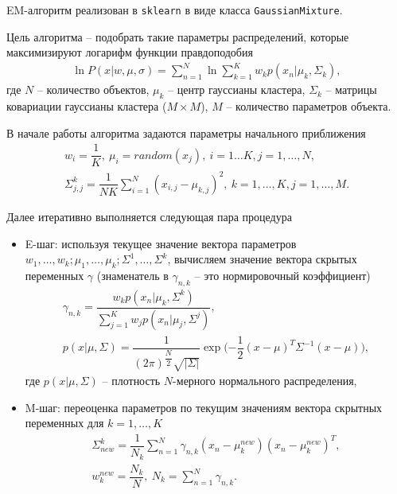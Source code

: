 \documentclass[%
	11pt,
	a4paper,
	utf8,
		]{article}
\begin{document}
EM-алгоритм реализован в \texttt{sklearn} в виде класса \texttt{GaussianMixture}.

Цель алгоритма -- подобрать такие параметры распределений, которые максимизируют логарифм функции правдоподобия
\begin{align*}
	\ln P(x | w, \mu, \sigma) = \sum_{n=1}^{N} \ln \sum_{k=1}^{K} w_k p(x_n | \mu_k, \Sigma_k),
\end{align*}
где $ N $ -- количество объектов, $ \mu_k $ -- центр гауссианы кластера, $ {\Sigma_k} $ -- матрицы ковариации гауссианы кластера ($ M \times M $), $ M $ -- количество параметров объекта.

В начале работы алгоритма задаются параметры начального приближения
\begin{align*}
	w_i = \dfrac{1}{K}, \ \mu_i = random(x_j), \ i = 1 \ldots K, j = 1, \ldots, N,\\
	\Sigma_{j,j}^k = \dfrac{1}{NK} \sum_{i=1}^N (x_{i, j} - \mu_{k,j})^2, \ k=1,\ldots, K, j=1,\ldots, M.
\end{align*}


Далее итеративно выполняется следующая пара процедура
\begin{itemize}
	\item E-шаг: используя текущее значение вектора параметров $ w_1, \ldots, w_k; \mu_1, \ldots, \mu_k; \Sigma^1, \ldots, \Sigma^k $, вычисляем значение вектора скрытых переменных $ \gamma $ (знаменатель в $ \gamma_{n,k} $ -- это нормировочный коэффициент)
\begin{align*}
	\gamma_{n,k} = \dfrac{ w_k p(x_n | \mu_k, \Sigma^k) }{\sum_{j=1}^{K} w_j p(x_n | \mu_j, \Sigma^j)},\\
	p(x | \mu, \Sigma) = \dfrac{1}{ (2 \pi)^{ \dfrac{N}{2} } \sqrt{| \Sigma |} } \exp\big({ - \dfrac{1}{2}(x - \mu)^T \Sigma^{-1} (x - \mu) }\big),
\end{align*}
где $ p(x | \mu, \Sigma) $ -- плотность $ N $-мерного нормального распределения,

    \item M-шаг: переоценка параметров по текущим значениям вектора скрытных переменных для $ k = 1,\ldots, K $
\begin{align*}
	\Sigma_{new}^k = \dfrac{1}{N_k} \sum_{n=1}^N \gamma_{n,k} (x_n - \mu_k^{new})(x_n - \mu_k^{new})^T,\\
	w_k^{new} = \dfrac{N_k}{N}, \ N_k = \sum_{n=1}^N \gamma_{n,k}.
\end{align*}
\end{itemize}
\end{document}

